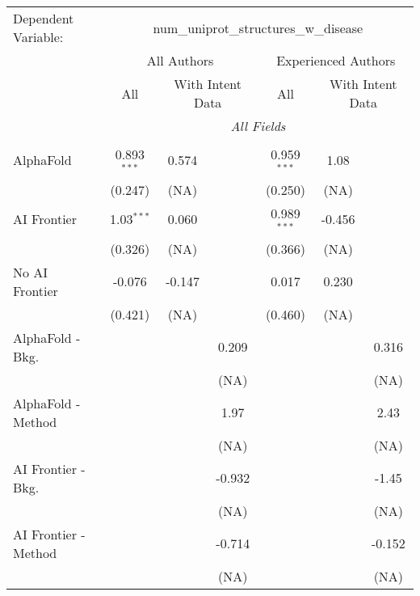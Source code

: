 \begingroup
\centering
\begin{tabular}{lcccccc}
   \tabularnewline \midrule \midrule
   Dependent Variable: & \multicolumn{6}{c}{num\_uniprot\_structures\_w\_disease}\\
 & \multicolumn{3}{c}{All Authors} & \multicolumn{3}{c}{Experienced Authors} \\
\cmidrule(lr){2-4} \cmidrule(lr){5-7}
 & \multicolumn{1}{c}{All} & \multicolumn{2}{c}{With Intent Data} & \multicolumn{1}{c}{All} & \multicolumn{2}{c}{With Intent Data} \\
\cmidrule(lr){2-2} \cmidrule(lr){3-4} \cmidrule(lr){5-5} \cmidrule(lr){6-7}
 & \multicolumn{6}{c}{\textit{All Fields}} \\ \\
   AlphaFold               & 0.893$^{***}$ & 0.574  &        & 0.959$^{***}$ & 1.08   &   \\   
                           & (0.247)       & (NA)   &        & (0.250)       & (NA)   &   \\   
   AI Frontier             & 1.03$^{***}$  & 0.060  &        & 0.989$^{***}$ & -0.456 &   \\   
                           & (0.326)       & (NA)   &        & (0.366)       & (NA)   &   \\   
   No AI Frontier          & -0.076        & -0.147 &        & 0.017         & 0.230  &   \\   
                           & (0.421)       & (NA)   &        & (0.460)       & (NA)   &   \\   
   AlphaFold - Bkg.        &               &        & 0.209  &               &        & 0.316\\   
                           &               &        & (NA)   &               &        & (NA)\\   
   AlphaFold - Method      &               &        & 1.97   &               &        & 2.43\\   
                           &               &        & (NA)   &               &        & (NA)\\   
   AI Frontier - Bkg.      &               &        & -0.932 &               &        & -1.45\\   
                           &               &        & (NA)   &               &        & (NA)\\   
   AI Frontier - Method    &               &        & -0.714 &               &        & -0.152\\   
                           &               &        & (NA)   &               &        & (NA)\\   

\end{tabular}
